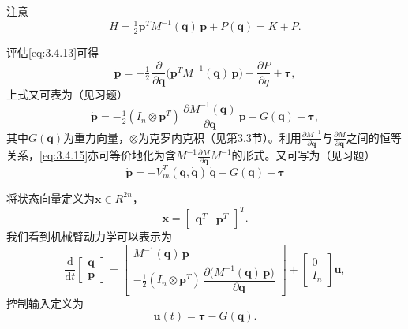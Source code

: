 \documentclass[12pt,a4paper]{ctexart}
\begin{document}
注意
\begin{equation}\label{eq:3.4.14}
H = \tfrac{1}{2}\bm{p}^{T} M^{-1}(\bm{q})\,\bm{p} + P(\bm{q}) = K + P.
\end{equation}

评估\eqref{eq:3.4.13}可得
\begin{equation*}
\dot{\bm{p}} = -\tfrac{1}{2}\,\frac{\partial}{\partial \bm{q}}\bigl(\bm{p}^{T} M^{-1}(\bm{q})\,\bm{p}\bigr) - \frac{\partial P}{\partial q} + \bm{\tau},
\end{equation*}
上式又可表为（见习题）
\begin{equation}\label{eq:3.4.15}
\dot{\bm{p}} = -\tfrac{1}{2}(I_n \otimes \bm{p}^{T})\,\frac{\partial M^{-1}(\bm{q})}{\partial \bm{q}}\,\bm{p} - G(\bm{q}) + \bm{\tau},
\end{equation}
其中$G(\bm{q})$为重力向量，$\otimes$为克罗内克积（见第3.3节）。利用$\frac{\partial M^{-1}}{\partial \bm{q}}$与$\frac{\partial M}{\partial \bm{q}}$之间的恒等关系，\eqref{eq:3.4.15}亦可等价地化为含$M^{-1}\frac{\partial M}{\partial \bm{q}}M^{-1}$的形式。又可写为（见习题）
\begin{equation}
\dot{\bm{p}} = -V_m^{T}(\bm{q},\dot{\bm{q}})\,\dot{\bm{q}} - G(\bm{q}) + \bm{\tau}
\end{equation}

将状态向量定义为$\bm{x}\in R^{2n}$，
\begin{equation}\label{eq:3.4.16}
\bm{x} = \begin{bmatrix} \bm{q}^{T} & \bm{p}^{T} \end{bmatrix}^{T}.
\end{equation}
我们看到机械臂动力学可以表示为
\begin{equation}\label{eq:3.4.17}
\frac{\mathrm{d}}{\mathrm{d}t}\begin{bmatrix} \bm{q} \\ \bm{p} \end{bmatrix} = \begin{bmatrix} M^{-1}(\bm{q})\,\bm{p} \\ -\tfrac{1}{2}(I_n \otimes \bm{p}^{T})\,\dfrac{\partial\bigl(M^{-1}(\bm{q})\,\bm{p}\bigr)}{\partial \bm{q}} \end{bmatrix} + \begin{bmatrix} 0 \\ I_n \end{bmatrix}\bm{u},
\end{equation}
控制输入定义为
\begin{equation}\label{eq:3.4.18}
\bm{u}(t) = \bm{\tau} - G(\bm{q}).
\end{equation}
\end{document}
